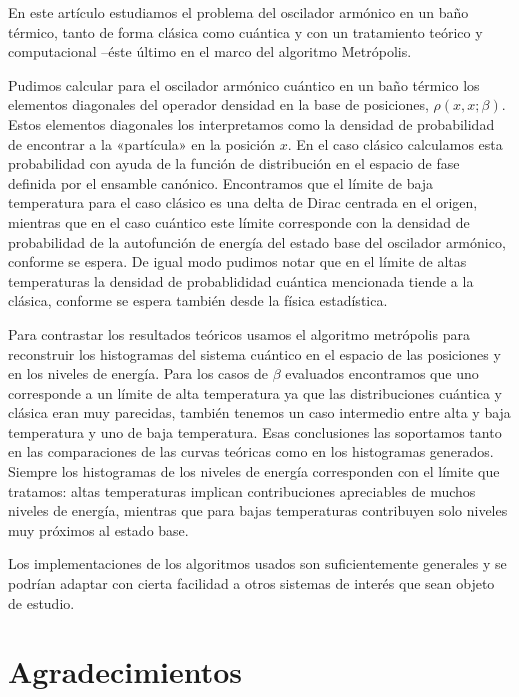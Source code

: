 \documentclass[%
 reprint,
 amsmath,amssymb,
 aps,
 pra,
]{revtex4-2}
\begin{document}
En este artículo estudiamos el problema del oscilador armónico en un baño térmico, tanto de forma clásica como cuántica y con un tratamiento teórico y computacional –éste último en el marco del algoritmo Metrópolis.

Pudimos calcular para el oscilador armónico cuántico en un baño térmico los elementos diagonales del operador densidad en la base de posiciones, $\rho(x,x;\beta)$. Estos elementos diagonales los interpretamos como la densidad de probabilidad de encontrar a la «partícula» en la posición $x$. En el caso clásico calculamos esta probabilidad con ayuda de la función de distribución en el espacio de fase definida por el ensamble canónico. Encontramos que el límite de baja temperatura para el caso clásico es una delta de Dirac centrada en el origen, mientras que en el caso cuántico este límite corresponde con la densidad de probabilidad de la autofunción de energía del estado base del oscilador armónico, conforme se espera. De igual modo pudimos notar que en el límite de altas temperaturas la densidad de probablididad cuántica mencionada tiende a la clásica, conforme se espera también desde la física estadística. 

Para contrastar los resultados teóricos usamos el algoritmo metrópolis para reconstruir los histogramas del sistema cuántico en el espacio de las posiciones y en los niveles de energía. Para los casos de $\beta$ evaluados encontramos que uno corresponde a un límite de alta temperatura ya que las distribuciones cuántica y clásica eran muy parecidas, también tenemos un caso intermedio entre alta y baja temperatura y uno de baja temperatura. Esas conclusiones las soportamos tanto en las comparaciones de las curvas teóricas como en los histogramas generados. Siempre los histogramas de los niveles de energía corresponden con el límite que tratamos: altas temperaturas implican contribuciones apreciables de muchos niveles de energía, mientras que para bajas temperaturas contribuyen solo niveles muy próximos al estado base.

Los implementaciones de los algoritmos usados son suficientemente generales y se podrían adaptar con cierta facilidad a otros sistemas de interés que sean objeto de estudio. 
\section*{Agradecimientos}

\newpage

\appendix
\end{document}
